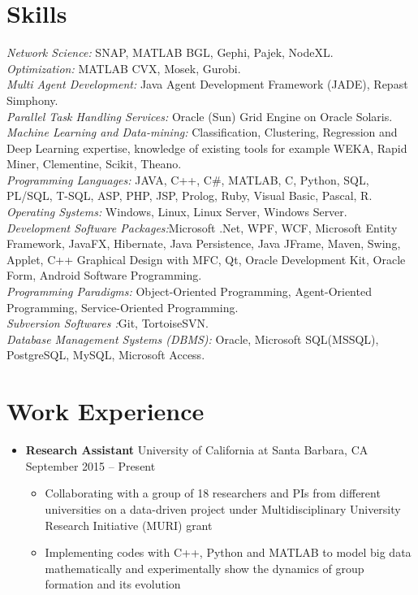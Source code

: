 \documentclass[letter]{res}
\begin{document}
\begin{resume}
\section{Skills}
{\sl Network Science: }SNAP, MATLAB BGL, Gephi, Pajek, NodeXL.\\
{\sl Optimization: }MATLAB CVX, Mosek, Gurobi.\\
{\sl Multi Agent Development: }Java Agent Development Framework (JADE), Repast Simphony.\\
{\sl Parallel Task Handling Services: }Oracle (Sun) Grid Engine on Oracle Solaris.\\
{\sl Machine Learning and Data-mining: }Classification, Clustering, Regression and Deep Learning expertise, knowledge of existing tools for example WEKA, Rapid Miner, Clementine, Scikit, Theano.\\
\textit{Programming Languages: }JAVA, C++, C\#, MATLAB, C, Python, SQL, PL/SQL, T-SQL, ASP, PHP, JSP, Prolog, Ruby, Visual Basic, Pascal, R.\\
\textit{Operating Systems: } Windows, Linux, Linux Server, Windows Server.\\
\textit{Development Software Packages:}Microsoft .Net, WPF, WCF, Microsoft Entity Framework, JavaFX, Hibernate, Java Persistence, Java JFrame, Maven, Swing, Applet, C++ Graphical Design with MFC, Qt, Oracle Development Kit, Oracle Form, Android Software Programming.\\
\textit{Programming Paradigms: }Object-Oriented Programming, Agent-Oriented Programming, Service-Oriented Programming.\\
\textit{Subversion Softwares :}Git, TortoiseSVN.\\
\textit{Database Management Systems (DBMS): }Oracle, Microsoft SQL(MSSQL), PostgreSQL, MySQL, Microsoft Access.

\section{Work Experience}
\begin{itemize}[leftmargin=-.1in]
\item \textbf{Research Assistant} \newline
University of California at Santa Barbara, CA \hfill September 2015 – Present\\
   \vspace{-4mm}
   \iflong
     \begin{itemize}
     \item Collaborating with a group of 18 researchers and PIs from different universities on a data-driven project under Multidisciplinary University Research Initiative (MURI) grant
     \item Implementing codes with C++, Python and MATLAB to model big data mathematically and experimentally show the dynamics of group formation and its evolution
     \end{itemize}
   \fi
   

\end{itemize}
\end{resume}
\end{document}
